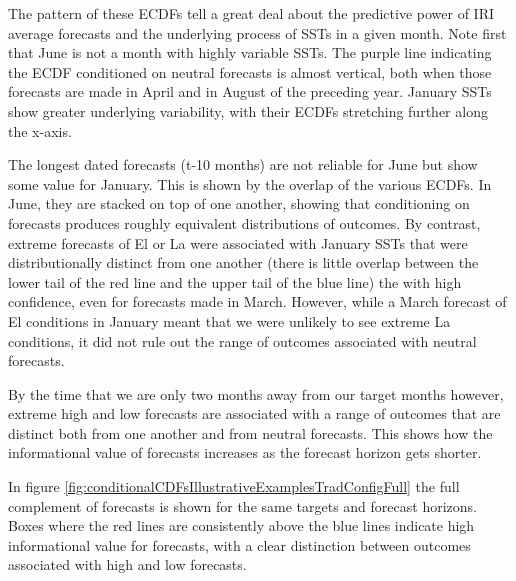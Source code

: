 \documentclass[article]{jss}
\begin{document}
The pattern of these ECDFs tell a great deal about the predictive power
of IRI average forecasts and the underlying process of SSTs in a given
month. Note first that June is not a month with highly variable SSTs.
The purple line indicating the ECDF conditioned on neutral forecasts is
almost vertical, both when those forecasts are made in April and in
August of the preceding year. January SSTs show greater underlying
variability, with their ECDFs stretching further along the x-axis.

The longest dated forecasts (t-10 months) are not reliable for June but
show some value for January. This is shown by the overlap of the various
ECDFs. In June, they are stacked on top of one another, showing that
conditioning on forecasts produces roughly equivalent distributions of
outcomes. By contrast, extreme forecasts of El  or La
 were associated with January SSTs that were
distributionally distinct from one another (there is little overlap
between the lower tail of the red line and the upper tail of the blue
line) the with high confidence, even for forecasts made in March.
However, while a March forecast of El  conditions in
January meant that we were unlikely to see extreme La 
conditions, it did not rule out the range of outcomes associated with
neutral forecasts.

By the time that we are only two months away from our target months
however, extreme high and low forecasts are associated with a range of
outcomes that are distinct both from one another and from neutral
forecasts. This shows how the informational value of forecasts increases
as the forecast horizon gets shorter.

In figure \ref{fig:conditionalCDFsIllustrativeExamplesTradConfigFull}
the full complement of forecasts is shown for the same targets and
forecast horizons. Boxes where the red lines are consistently above the
blue lines indicate high informational value for forecasts, with a clear
distinction between outcomes associated with high and low forecasts.
\end{document}
